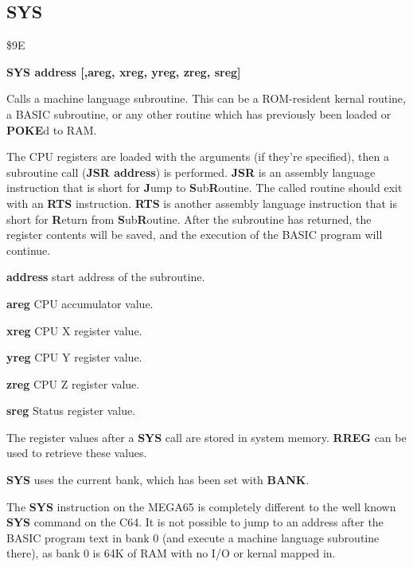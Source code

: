
\newpage
\subsection{SYS}
\begin{description}[leftmargin=2cm,style=nextline]
\item [Token:] \$9E
\item [Format:] {\bf SYS address [,areg, xreg, yreg, zreg, sreg]}
\item [Usage:]  Calls a machine language subroutine.
                This can be a ROM-resident kernal routine, a BASIC subroutine,
                or any other routine which has previously been loaded or {\bf POKE}d
                to RAM.

               The CPU registers are loaded with the arguments
               (if they're specified), then a subroutine call ({\bf JSR address})
               is performed. {\bf JSR} is an assembly language instruction that is short
               for {\bf J}ump to {\bf S}ub{\bf R}outine. The called routine should exit with
               an {\bf RTS} instruction. {\bf RTS} is another assembly language instruction that is
               short for {\bf R}eturn from {\bf S}ub{\bf R}outine. After the subroutine has returned,
               the register contents will be saved, and the execution of the BASIC program will
               continue.

               {\bf address} start address of the subroutine.

               {\bf areg} CPU accumulator value.

               {\bf xreg} CPU X register value.

               {\bf yreg} CPU Y register value.

               {\bf zreg} CPU Z register value.

               {\bf sreg} Status register value.

\item [Remarks:] The register values after a {\bf SYS} call are stored
                 in system memory. {\bf RREG} can be used to retrieve these values.

                 {\bf SYS} uses the current bank, which has been set with {\bf BANK}.

                 The {\bf SYS} instruction on the MEGA65 is completely different to the
                 well known {\bf SYS} command on the C64. It is not possible to jump
                 to an address after the BASIC program text in bank 0 (and execute
                 a machine language subroutine there), as bank 0 is 64K of
                 RAM with no I/O or kernal mapped in.


\end{description}
